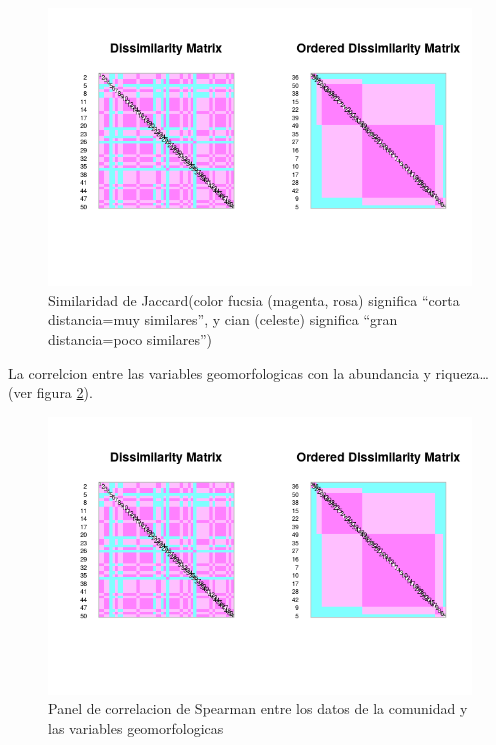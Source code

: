 \documentclass[11pt,]{article}
\begin{document}
\begin{figure}
\centering
\includegraphics{medicion_asociacion_jaccard.png}
\caption{Similaridad de Jaccard(color fucsia (magenta, rosa) significa
``corta distancia=muy similares'', y cian (celeste) significa ``gran
distancia=poco similares'')\label{fig:similaridad_jaccard}}
\end{figure}

La correlcion entre las variables geomorfologicas con la abundancia y
riqueza\ldots{}(ver figura
\ref{fig:matriz_correlacion_geomorf_abun_riq_spearman}).

\begin{figure}
\centering
\includegraphics{medicion_asociacion_jaccard.png}
\caption{Panel de correlacion de Spearman entre los datos de la
comunidad y las variables
geomorfologicas\label{fig:matriz_correlacion_geomorf_abun_riq_spearman}}
\end{figure}
\end{document}
